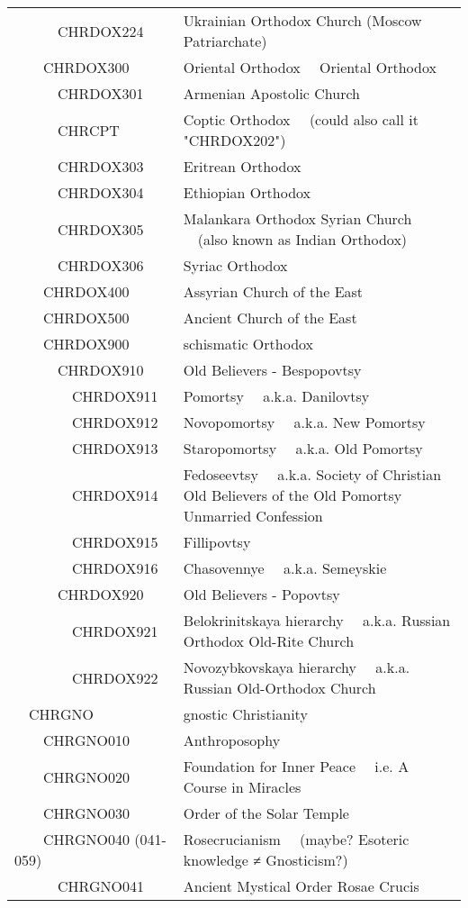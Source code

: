 \documentclass[12pt]{article}
\begin{document}
\begin{tiny}
\begin{center}
\begin{longtable}{|l|l|}
~~~~~~CHRDOX224 & Ukrainian Orthodox Church (Moscow Patriarchate) \\
~~~~CHRDOX300 & Oriental Orthodox	~~Oriental Orthodox \\
~~~~~~CHRDOX301 & Armenian Apostolic Church \\
~~~~~~CHRCPT & Coptic Orthodox	~~(could also call it "CHRDOX202") \\
~~~~~~CHRDOX303 & Eritrean Orthodox \\
~~~~~~CHRDOX304 & Ethiopian Orthodox \\
~~~~~~CHRDOX305 & Malankara Orthodox Syrian Church	~~(also known as Indian Orthodox) \\
~~~~~~CHRDOX306 & Syriac Orthodox \\
~~~~CHRDOX400 & Assyrian Church of the East \\
~~~~CHRDOX500 & Ancient Church of the East \\
~~~~CHRDOX900 & schismatic Orthodox \\
~~~~~~CHRDOX910 & Old Believers - Bespopovtsy \\
~~~~~~~~CHRDOX911 & Pomortsy	~~a.k.a. Danilovtsy \\
~~~~~~~~CHRDOX912 & Novopomortsy	~~a.k.a. New Pomortsy \\
~~~~~~~~CHRDOX913 & Staropomortsy	~~a.k.a. Old Pomortsy \\
~~~~~~~~CHRDOX914 & Fedoseevtsy	~~a.k.a. Society of Christian Old Believers of the Old Pomortsy Unmarried Confession \\
~~~~~~~~CHRDOX915 & Fillipovtsy \\
~~~~~~~~CHRDOX916 & Chasovennye	~~a.k.a. Semeyskie \\
~~~~~~CHRDOX920 & Old Believers - Popovtsy \\
~~~~~~~~CHRDOX921 & Belokrinitskaya hierarchy	~~a.k.a. Russian Orthodox Old-Rite Church \\
~~~~~~~~CHRDOX922 & Novozybkovskaya hierarchy	~~a.k.a. Russian Old-Orthodox Church \\
~~CHRGNO & gnostic Christianity \\
~~~~CHRGNO010 & Anthroposophy \\
~~~~CHRGNO020 & Foundation for Inner Peace	~~i.e. A Course in Miracles \\
~~~~CHRGNO030 & Order of the Solar Temple \\
~~~~CHRGNO040 (041-059) & Rosecrucianism	~~(maybe? Esoteric knowledge ≠ Gnosticism?) \\
~~~~~~CHRGNO041 & Ancient Mystical Order Rosae Crucis \\

\end{longtable}
\end{center}
\end{tiny}
\end{document}
